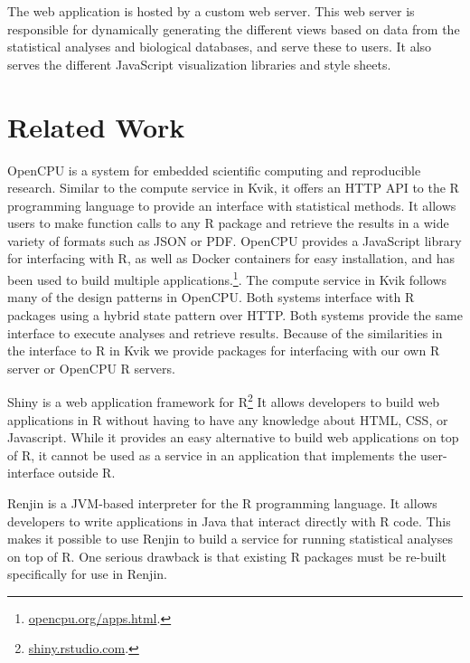 The web application is hosted by a custom web server. This web server is
responsible for dynamically generating the different views based on data from
the statistical analyses and biological databases, and serve these to users. It
also serves the different JavaScript visualization libraries and style sheets. 


\section{Related Work} 
OpenCPU is a system for embedded scientific computing and reproducible
research.\cite{opencpu} Similar to the compute service in Kvik, it offers an
HTTP API to the R programming language to provide an interface with statistical
methods. It allows users to make function calls to any R package and retrieve
the results in a wide variety of formats such as JSON or PDF. 
OpenCPU provides a JavaScript library for interfacing with R, as well as Docker
containers for easy installation, and has been used to build multiple
applications.\footnote{\url{opencpu.org/apps.html}.}. The compute service in
Kvik follows many of the design patterns in OpenCPU. Both systems interface with
R packages using a hybrid state pattern over HTTP. Both systems provide the same
interface to execute analyses and retrieve results.  Because of the similarities
in the interface to R in Kvik we provide packages for interfacing with our own R
server or OpenCPU R servers.

Shiny is a web application framework for R\footnote{\url{shiny.rstudio.com}.}
It allows developers to build web applications in R without having to have any
knowledge about HTML, CSS, or Javascript. While it provides an easy alternative
to build web applications on top of R, it cannot be used as a service in an
application that implements the user-interface outside R.  

Renjin is a JVM-based interpreter for the R programming language.\cite{renjin}
It allows developers to write applications in Java that interact directly with R
code. This makes it possible to use Renjin to build a service for running
statistical analyses on top of R. One serious drawback is that existing R
packages must be re-built specifically for use in Renjin. 

